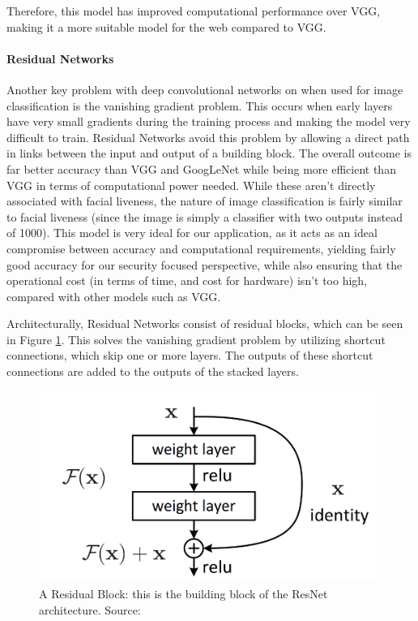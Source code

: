 \documentclass[10pt,a4paper]{article}
\begin{document}
            Therefore, this model has improved computational performance over VGG, making it a more suitable model for the web compared to VGG. \cite{DeepNeuralNetworkDeployability}
            
            \paragraph{Residual Networks}
            Another key problem with deep convolutional networks on when used for image classification is the vanishing gradient problem. This occurs when early layers have very small gradients during the training process and
            making the model very difficult to train. Residual Networks avoid this problem by allowing a direct path in links between the input and output of a building block.
            The overall outcome is far better accuracy than VGG and GoogLeNet while being more efficient than VGG in terms of computational power needed. \cite{DeepResidualNetworks}
            While these aren't directly associated with facial liveness, the nature of image classification is fairly similar to facial liveness (since the image is simply a classifier with two outputs instead of 1000).
            This model is very ideal for our application, as it acts as an ideal compromise between accuracy and computational requirements, yielding fairly good accuracy for our security focused perspective, while also
            ensuring that the operational cost (in terms of time, and cost for hardware) isn't too high, compared with other models such as VGG.

            Architecturally, Residual Networks consist of residual blocks, which can be seen in Figure \ref{ResidualBlock}. This solves the vanishing gradient problem by utilizing shortcut
            connections, which skip one or more layers. The outputs of these shortcut connections are added to the outputs of the stacked layers.

            \begin{figure}
                \centering
                \includegraphics[width=.7\linewidth]{ResidualBlock.png}
                \caption{A Residual Block: this is the building block of the ResNet architecture. Source: \cite{DeepResidualNetworks}}
                \label{ResidualBlock}
            \end{figure}
\end{document}
